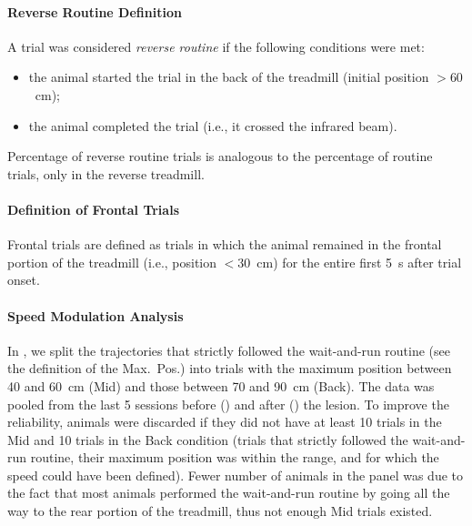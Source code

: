 \paragraph{Reverse Routine Definition}
A trial was considered \emph{reverse routine}\!{} if the following conditions were met:
\begin{itemize}[noitemsep]
    \item the animal started the trial in the back of the treadmill (initial position $> 60$~cm);
    \item the animal completed the trial (i.e., it crossed the infrared beam).
\end{itemize}
Percentage of reverse routine trials is analogous to the percentage of routine trials, only in the reverse treadmill.


\paragraph{Definition of Frontal Trials}
Frontal trials are defined as trials in which the animal remained in the frontal portion of the treadmill (i.e., position $<30$~cm) for the entire first 5~s after trial onset.


\paragraph{Speed Modulation Analysis}
In , we split the trajectories that strictly followed the wait-and-run routine (see the definition of the Max.\ Pos.) into trials with the maximum position between 40 and 60~cm (Mid) and those between 70 and 90~cm (Back).
The data was pooled from the last 5 sessions before () and after () the lesion.
To improve the reliability, animals were discarded if they did not have at least 10 trials in the Mid and 10 trials in the Back condition (trials that strictly followed the wait-and-run routine, their maximum position was within the range, and for which the speed could have been defined).
Fewer number of animals in the  panel was due to the fact that most animals performed the wait-and-run routine by going all the way to the rear portion of the treadmill, thus not enough Mid trials existed.



